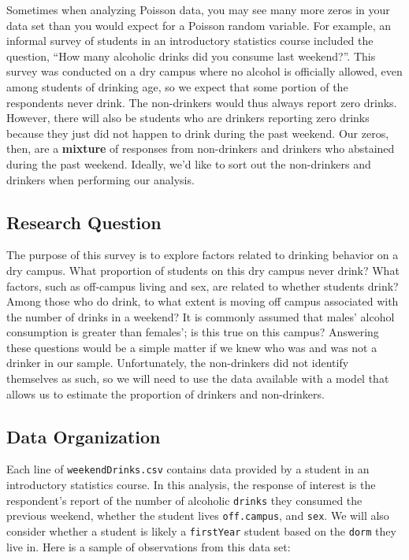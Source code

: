 \documentclass[
]{krantz}
\begin{document}
Sometimes when analyzing Poisson data, you may see many more zeros in your data set than you would expect for a Poisson random variable. For example, an informal survey of students in an introductory statistics course included the question, ``How many alcoholic drinks did you consume last weekend?''. This survey was conducted on a dry campus where no alcohol is officially allowed, even among students of drinking age, so we expect that some portion of the respondents never drink. The non-drinkers would thus always report zero drinks. However, there will also be students who are drinkers reporting zero drinks because they just did not happen to drink during the past weekend. Our zeros, then, are a \textbf{mixture} of responses from non-drinkers and drinkers who abstained during the past weekend. Ideally, we'd like to sort out the non-drinkers and drinkers when performing our analysis.

\hypertarget{research-question}{%
\subsection{Research Question}\label{research-question}}

The purpose of this survey is to explore factors related to drinking behavior on a dry campus. What proportion of students on this dry campus never drink? What factors, such as off-campus living and sex, are related to whether students drink? Among those who do drink, to what extent is moving off campus associated with the number of drinks in a weekend? It is commonly assumed that males' alcohol consumption is greater than females'; is this true on this campus? Answering these questions would be a simple matter if we knew who was and was not a drinker in our sample. Unfortunately, the non-drinkers did not identify themselves as such, so we will need to use the data available with a model that allows us to estimate the proportion of drinkers and non-drinkers.

\hypertarget{data-organization-2}{%
\subsection{Data Organization}\label{data-organization-2}}

Each line of \texttt{weekendDrinks.csv} contains data provided by a student in an introductory statistics course. In this analysis, the response of interest is the respondent's report of the number of alcoholic \texttt{drinks} they consumed the previous weekend, whether the student lives \texttt{off.campus}, and \texttt{sex}. We will also consider whether a student is likely a \texttt{firstYear} student based on the \texttt{dorm} they live in. Here is a sample of observations from this data set:
\end{document}
